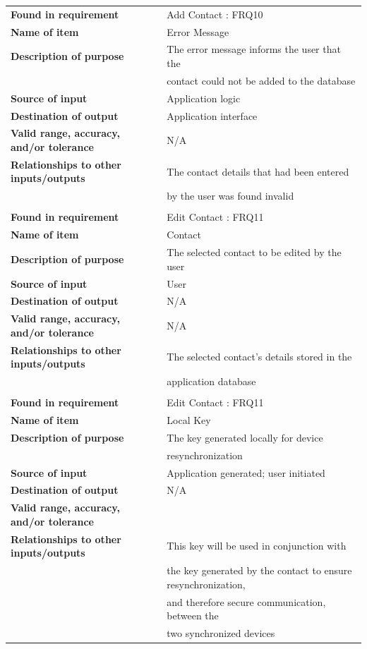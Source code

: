 \newpage
\begin{tabular}{ll}
\textbf{Found in requirement}&Add Contact : FRQ10\\
\textbf{Name of item}&Error Message\\
\textbf{Description of purpose}&The error message informs the user that the\\& contact could not be added to the database\\
\textbf{Source of input}&Application logic\\
\textbf{Destination of output}&Application interface\\
\textbf{Valid range, accuracy, and/or tolerance}&N/A\\
\textbf{Relationships to other inputs/outputs}&The contact details that had been entered\\& by the user was found invalid\\
&\\
\textbf{Found in requirement}&Edit Contact : FRQ11\\
\textbf{Name of item}&Contact\\
\textbf{Description of purpose}&The selected contact to be edited by the user\\
\textbf{Source of input}&User\\
\textbf{Destination of output}&N/A\\
\textbf{Valid range, accuracy, and/or tolerance}&N/A\\
\textbf{Relationships to other inputs/outputs}&The selected contact's details stored in the\\& application database\\
&\\
\textbf{Found in requirement}&Edit Contact : FRQ11\\
\textbf{Name of item}&Local Key\\
\textbf{Description of purpose}&The key generated locally for device\\& resynchronization\\
\textbf{Source of input}&Application generated; user initiated\\
\textbf{Destination of output}&N/A\\
\textbf{Valid range, accuracy, and/or tolerance}&\\
\textbf{Relationships to other inputs/outputs}&This key will be used in conjunction with\\& the key generated by the contact to ensure resynchronization,\\& and therefore secure communication, between the\\& two synchronized devices\\

\end{tabular}
